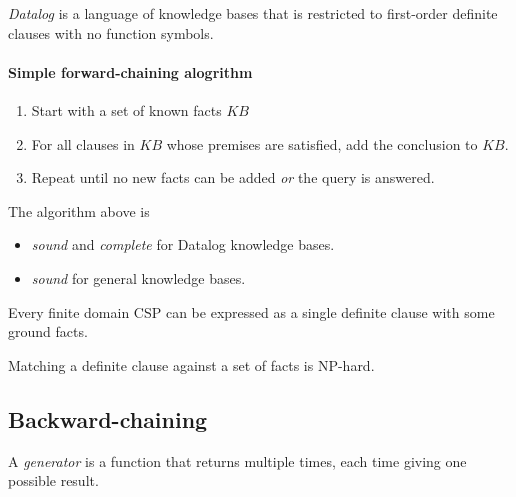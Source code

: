 \documentclass{article}
\begin{document}
\begin{definition}[R\&N p. 331]
    \emph{Datalog} is a language of knowledge bases that is restricted to first-order
    definite clauses with no function symbols.
\end{definition}

\paragraph{Simple forward-chaining alogrithm}

\begin{enumerate}
    \item Start with a set of known facts $KB$
    \item For all clauses in $KB$ whose premises are satisfied, add the conclusion to $KB$.
    \item Repeat until no new facts can be added \emph{or} the query is answered.
\end{enumerate}

\begin{theorem}
    The algorithm above is
    \begin{itemize}
        \item \emph{sound} and \emph{complete} for Datalog knowledge bases.
        \item \emph{sound} for general knowledge bases.
    \end{itemize}
\end{theorem}

\begin{theorem}[R\&N p. 334]
    Every finite domain CSP can be expressed as a 
    single definite clause with some ground facts.
\end{theorem}

\begin{theorem}
    Matching a definite clause against a set of facts is NP-hard.
\end{theorem}

\subsection{Backward-chaining}

\begin{definition}[R\&N p. 337]
    A \emph{generator} is a function that returns multiple times, each time giving one
    possible result.
\end{definition}
\end{document}
